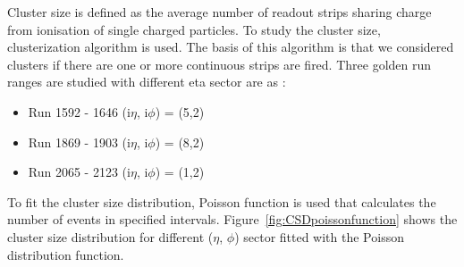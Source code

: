 Cluster size is defined as the average number of readout strips sharing charge from ionisation of single charged particles.
To study the cluster size, clusterization algorithm is used. The basis of this algorithm is that we considered clusters if there are one or more continuous strips are fired.
Three golden run ranges are studied with different eta sector are as :\\
\begin{itemize}
\item{Run 1592 - 1646 (i$\eta$, i$\phi$) = (5,2)}
\item{Run 1869 - 1903 (i$\eta$, i$\phi$) = (8,2)}
\item{Run 2065 - 2123 (i$\eta$, i$\phi$) = (1,2)}
\end{itemize}
To fit the cluster size distribution, Poisson function is used that calculates the number of events in specified intervals. Figure~\ref{fig:CSDpoissonfunction} shows the cluster size distribution for different ($\eta$, $\phi$) sector fitted with the Poisson distribution function.
